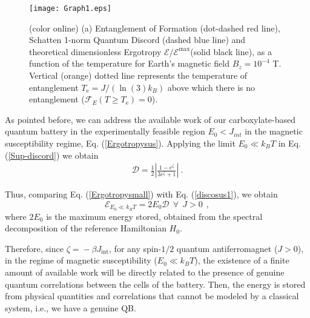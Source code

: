\documentclass[aps,prl,epsfigure,twocolumn,superscriptaddress]{revtex4-1}
\newcommand{\Dcal}{\mathcal{D}}
\newcommand{\Ecal}{\mathcal{E}}
\newcommand{\Fcal}{\mathcal{F}}
\newcommand{\1}{\mathbbm{1}}
\begin{document}
\begin{figure}[t!]
	\texttt{[image: Graph1.eps]}~
	\caption{(color online) (a) Entanglement of Formation (dot-dashed red line), Schatten 1-norm Quantum Discord (dashed blue line) and theoretical  dimensionless Ergotropy $\Ecal/\Ecal^{\text{max}}$(solid black line), as a function of the temperature for Earth's magnetic field $B_z\!=\!10^{-4}$ T. Vertical (orange) dotted line represents the temperature of entanglement $T_{\text{e}}=J /(\ln (3)k_{B})$ above which there is no entanglement ($\Fcal_{E}(T\!\geq\! T_{\text{e}})\!=\!0$).}
	\label{Sup-QuantitiesFig}
\end{figure}

As pointed before, we can address the available work of our carboxylate-based quantum battery in the experimentally feasible region $E_{0}\!<\! J_{int}$  in the magnetic susceptibility regime, Eq. (\ref{Ergotropysus}). Applying the limit $E_0\ll k_{B}T$ in Eq. (\ref{Sup-discord}) we obtain
\begin{align}
\Dcal = \frac{1}{2} \left\vert\frac{1-e^{\zeta}}{3e^{\zeta} +1}\right\vert ~.
\label{discosus1}
\end{align}

Thus, comparing Eq. (\ref{Ergotropysmall}) with Eq. (\ref{discosus1}), we obtain 
\begin{equation} 
\Ecal_{E_0\ll k_{B}T}  = 2E_0 \Dcal ~~ \forall ~~ J>0 ~~,
\label{discord2}
\end{equation}
where $2E_0$ is the maximum energy stored, obtained from the spectral decomposition of the reference Hamiltonian $H_0$. 

Therefore, since ${\zeta}\!=\! -\beta J_{\text{int}}$, for any spin-$1/2$ quantum antiferromagnet ($J>0$), in the regime of magnetic susceptibility ($E_0\ll k_{B}T$), the existence of a finite amount of available work will be directly related to the presence of genuine quantum correlations between the cells of the battery. Then, the energy is stored from physical quantities and correlations that cannot be modeled by a classical system, i.e., we have a genuine QB. 
\end{document}
